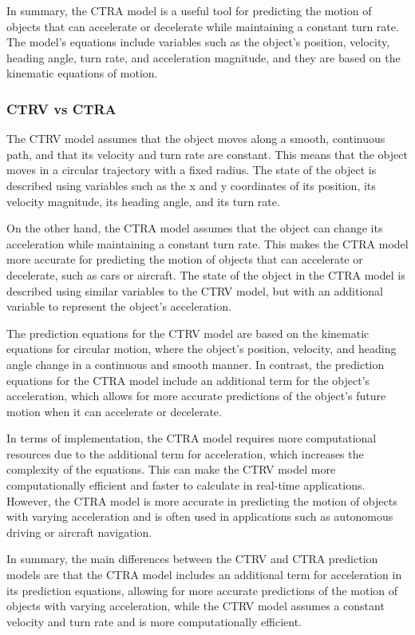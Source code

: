 In summary, the CTRA model is a useful tool for predicting the motion of objects that can accelerate or decelerate while maintaining a constant turn rate. The model's equations include variables such as the object's position, velocity, heading angle, turn rate, and acceleration magnitude, and they are based on the kinematic equations of motion.

\subsubsection{CTRV vs CTRA}
\label{subsubsec:3_CTRV_vs_CTRA}

The CTRV model assumes that the object moves along a smooth, continuous path, and that its velocity and turn rate are constant. This means that the object moves in a circular trajectory with a fixed radius. The state of the object is described using variables such as the x and y coordinates of its position, its velocity magnitude, its heading angle, and its turn rate.

On the other hand, the CTRA model assumes that the object can change its acceleration while maintaining a constant turn rate. This makes the CTRA model more accurate for predicting the motion of objects that can accelerate or decelerate, such as cars or aircraft. The state of the object in the CTRA model is described using similar variables to the CTRV model, but with an additional variable to represent the object's acceleration.

The prediction equations for the CTRV model are based on the kinematic equations for circular motion, where the object's position, velocity, and heading angle change in a continuous and smooth manner. In contrast, the prediction equations for the CTRA model include an additional term for the object's acceleration, which allows for more accurate predictions of the object's future motion when it can accelerate or decelerate.

In terms of implementation, the CTRA model requires more computational resources due to the additional term for acceleration, which increases the complexity of the equations. This can make the CTRV model more computationally efficient and faster to calculate in real-time applications. However, the CTRA model is more accurate in predicting the motion of objects with varying acceleration and is often used in applications such as autonomous driving or aircraft navigation.

In summary, the main differences between the CTRV and CTRA prediction models are that the CTRA model includes an additional term for acceleration in its prediction equations, allowing for more accurate predictions of the motion of objects with varying acceleration, while the CTRV model assumes a constant velocity and turn rate and is more computationally efficient.

